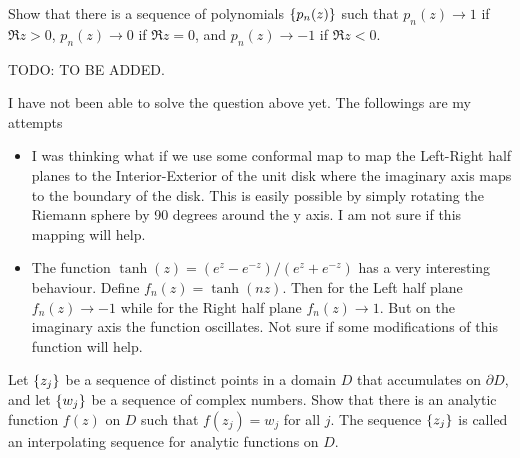 \begin{problem}[]
	Show that there is a sequence of polynomials $ \{p_n(z)\} $ such that $ p_n(z)\to 1 $ if $ \Re{z}>0 $, $ p_n(z)\to 0 $ if $ \Re{z} = 0 $, and $ p_n(z) \to -1 $ if $ \Re{z}<0 $.
\end{problem}
\begin{solution}
	{\color{red} \noindent TODO: TO BE ADDED.}
\end{solution}
\begin{remark}
	I have not been able to solve the question above yet. The followings are my attempts 
	\begin{itemize}
		\item I was thinking what if we use some conformal map to map the Left-Right half planes to the Interior-Exterior of the unit disk where the imaginary axis maps to the boundary of the disk. This is easily possible by simply rotating the Riemann sphere by 90 degrees around the y axis. I am not sure if this mapping will help.
		\item The function $ \tanh(z) = (e^z-e^{-z})/(e^z + e^{-z}) $ has a very interesting behaviour. Define $ f_n(z) = \tanh(nz) $. Then for the Left half plane $ f_n(z) \to -1 $ while for the Right half plane $ f_n(z) \to 1$. But on the imaginary axis the function oscillates. Not sure if some modifications of this function will help.
	\end{itemize}
\end{remark}


\begin{problem}
	Let $ \{z_j\} $ be a sequence of distinct points in a domain $ D $ that accumulates on $ \partial D $, and let $ \{w_j\} $ be a sequence of complex numbers. Show that there is an analytic function $ f(z) $ on $ D $ such that $ f(z_j)=w_j $ for all $ j $. The sequence $ \{z_j\} $ is called an interpolating sequence for analytic functions on $ D $.
\end{problem}